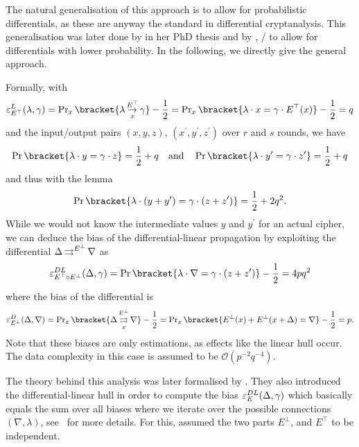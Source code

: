The natural generalisation of this approach is to allow for probabilistic differentials, as these are anyway the standard in differential cryptanalysis.
This generalisation was later done by \textcite{PhD:Langford95} in her PhD thesis and by \textcite{AC:BihDunKel02}, \ie/ to allow for differentials with lower probability.
In the following, we directly give the general approach.

Formally, with
\begin{equation*}
    \bias_{E^\top}^L(\lambda, \gamma) = \Prob_x\bracket{\propLin{\lambda}{E^\top}{x}{\gamma}} - \frac{1}{2} = \Prob_x\bracket{\iprod{\lambda}{x} = \iprod{\gamma}{E^\top(x)}} - \frac{1}{2} = q
\end{equation*}
and the input/output pairs $(x, y, z)$, $(x^\prime, y^\prime, z^\prime)$ over $r$ and $s$ rounds, we have
\begin{equation*}
        \Prob\bracket{\iprod{\lambda}{y} = \iprod{\gamma}{z}} = \frac{1}{2} + q
        \quad \text{and} \quad
        \Prob\bracket{\iprod{\lambda}{y^\prime} = \iprod{\gamma}{z^\prime}} = \frac{1}{2} + q
\end{equation*}
and thus with the  lemma
\begin{equation*}
        \Prob\bracket{\iprod{\lambda}{(y+y^\prime)} = \iprod{\gamma}{(z+z^\prime)}} = \frac{1}{2} + 2q^2.
\end{equation*}
While we would not know the intermediate values $y$ and $y^\prime$ for an actual cipher, we can deduce the bias of the differential-linear propagation by exploiting the differential $\Delta \operatorname*{\rightrightarrows}^{E^\bot}_{} \nabla$ as
\begin{equation}\label{eq:dl_bias_simple}
           \bias_{E^\top \circ E^\bot}^{DL}(\Delta, \gamma)
        = \Prob\bracket{\iprod{\lambda}{\nabla} = \iprod{\gamma}{(z+z^\prime)}} - \frac{1}{2} = 4pq^2
\end{equation}
where the bias of the differential is
\begin{equation*}
    \bias_{E^\bot}^D(\Delta, \nabla) = \Prob_x\bracket{\propDiff{\Delta}{E^\bot}{x}{\nabla}} - \frac{1}{2} = \Prob_x\bracket{E^\bot(x) + E^\bot(x + \Delta) = \nabla} - \frac{1}{2} = p.
\end{equation*}
Note that these biases are only estimations, as effects like the linear hull occur.
The data complexity in this case is assumed to be $\mathcal{O}(p^{-2}q^{-4})$.

The theory behind this analysis was later formalised by \textcite{FSE:BloLeaNyb14,JC:BloLeaNyb17}.
They also introduced the differential-linear hull in order to compute the bias $\operatorname{\varepsilon}_{E}^{DL}(\Delta, \gamma)$ which basically equals the sum over all biases where we iterate over the possible connections $(\nabla,\lambda)$, see~\cite[Sections~3 and~4]{FSE:BloLeaNyb14} for more details.
For this, \citeauthor{FSE:BloLeaNyb14} assumed the two parts $E^\bot$, and $E^\top$ to be independent.

